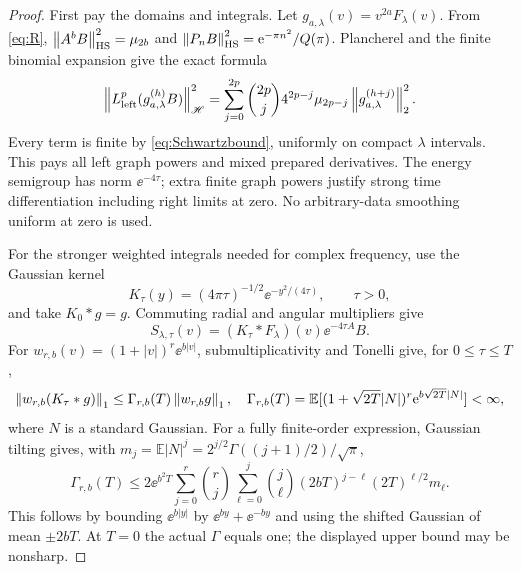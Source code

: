 \begin{proof}
First pay the domains and integrals. Let
$g_{a,\lambda}(v)=v^{2a}F_\lambda(v)$.
From \eqref{eq:R},
$\left\lVert A^bB\right\rVert_{\operatorname{HS}}^2=\mu_{2b}$ and
$\left\lVert P_nB\right\rVert_{\operatorname{HS}}^2=\mathrm e^{-\pi n^2}/Q(\pi)$.
Plancherel and the finite binomial expansion give the exact formula
\begin{equation}\label{eq:HSgraph}
 \left\lVert L_{\rm left}^p(g_{a,\lambda}^{(h)}B)\right\rVert_{\mathscr H}^2
 =\sum_{j=0}^{2p}\binom{2p}{j}4^{2p-j}\mu_{2p-j}
       \left\lVert g_{a,\lambda}^{(h+j)}\right\rVert_2^2.
\end{equation}
Every term is finite by \eqref{eq:Schwartzbound}, uniformly on compact
$\lambda$ intervals. This pays all left graph powers and mixed prepared
derivatives. The energy semigroup has norm $\ee^{-4\tau}$;
extra finite graph powers justify strong time differentiation including
right limits at zero. No arbitrary-data smoothing uniform at zero is used.

For the stronger weighted integrals needed for complex frequency,
use the Gaussian kernel
\[
 K_\tau(y)=(4\pi\tau)^{-1/2}\ee^{-y^2/(4\tau)},\qquad \tau>0,
\]
and take $K_0*g=g$. Commuting radial and angular multipliers give
\begin{equation}\label{eq:heatfactor}
 S_{\lambda,\tau}(v)=(K_\tau*F_\lambda)(v)\ee^{-4\tau A}B.
\end{equation}
For $w_{r,b}(v)=(1+|v|)^r\ee^{b|v|}$, submultiplicativity and Tonelli
give, for $0\le\tau\le T$,
\begin{equation}\label{eq:weightedheat}
 \left\lVert w_{r,b}(K_\tau*g)\right\rVert_1
 \le\Gamma_{r,b}(T)\left\lVert w_{r,b}g\right\rVert_1,
 \quad
 \Gamma_{r,b}(T)=\mathbb E[(1+\sqrt{2T}|N|)^r\mathrm e^{b\sqrt{2T}|N|}]<\infty,
\end{equation}
where $N$ is a standard Gaussian. For a fully finite-order expression,
Gaussian tilting gives, with
$m_j=\mathbb E|N|^j=2^{j/2}\Gamma((j+1)/2)/\sqrt\pi$,
\begin{equation}\label{eq:gaussianbound}
 \Gamma_{r,b}(T)\le2\ee^{b^2T}
 \sum_{j=0}^r\binom rj\sum_{\ell=0}^j\binom j\ell
 (2bT)^{j-\ell}(2T)^{\ell/2}m_\ell.
\end{equation}
This follows by bounding $\ee^{b|y|}$ by $\ee^{by}+\ee^{-by}$ and
using the shifted Gaussian of mean $\pm2bT$. At $T=0$ the actual
$\Gamma$ equals one; the displayed upper bound may be nonsharp.


\end{proof}

